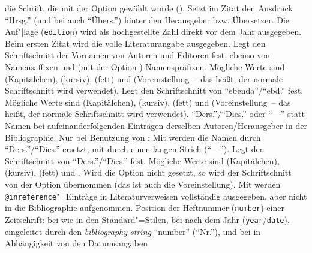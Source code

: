 \documentclass[ngerman]{scrartcl}
\begin{document}
    die Schrift, die mit der Option  gewählt wurde ().
	  Setzt im Zitat den Ausdruck \enquote{Hrsg.} (und bei 
	  auch \enquote{Übers.}) hinter den Herausgeber bzw. Übersetzer.
    Die Auf"|lage (\texttt{edition}) wird als hochgestellte Zahl direkt vor
    dem Jahr ausgegeben.
    Beim ersten Zitat wird die volle Literaturangabe ausgegeben.
	  Legt den Schriftschnitt der Vornamen von Autoren und Editoren fest, ebenso 
	  von Namensaffixen und (mit der Option ) 
	  Namenspräfixen.
	  Mögliche Werte sind  (Kapitälchen),  (kursiv),
	   (fett) und  (Voreinstellung~-- das heißt,
	  der normale Schriftschnitt wird verwendet).
	  Legt den Schriftschnitt von \enquote{ebenda}\slash\enquote{ebd.} fest.
	  Mögliche Werte sind  (Kapitälchen),  (kursiv),
	   (fett) und  (Voreinstellung~-- das heißt,
	  der normale Schriftschnitt wird verwendet).
	  \enquote{Ders.}\slash\enquote{Dies.} oder \enquote{---} statt Namen bei 
	  aufeinanderfolgenden Einträgen derselben Autoren\slash Herausgeber in der 
	  Bibliographie.
	  Nur bei Benutzung von : Mit  werden die 
	  Namen durch \enquote{Ders.}\slash\enquote{Dies.} ersetzt, mit 
	  durch einen langen Strich (\enquote{---}).
	  Legt den Schriftschnitt von \enquote{Ders.}\slash\enquote{Dies.} fest.
	  Mögliche Werte sind  (Kapitälchen),  (kursiv),
	   (fett) und . Wird die Option nicht gesetzt, so 
	  wird der Schriftschnitt von der Option  übernommen (das 
	  ist auch die Voreinstellung).
	  Mit  werden \texttt{@inreference}"=Einträge in Literaturverweisen
	  vollständig ausgegeben, aber nicht in die Bibliographie aufgenommen.
	  Position der Heftnummer (\texttt{number}) einer Zeitschrift: bei
	   wie in den Standard"=Stilen, bei  nach dem
	  Jahr (\texttt{year}\slash \texttt{date}), eingeleitet durch den \emph{bibliography string} \enquote{number}
	  (\enquote{Nr.}), und bei  in Abhängigkeit von den Datumsangaben
\end{document}
